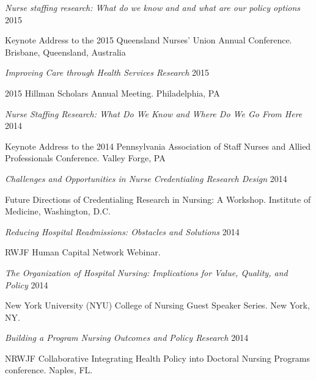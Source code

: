 \documentclass[10pt,]{article}
\begin{document}
{{{{{{{{{{{{{{{\begin{hangparas}{.5in}{1}
{\textit {Nurse staffing research: What do we know and and what are our policy options}} \hfill 2015 
\vspace{-2.5mm}
\begin{adjustwidth}{0.5cm}{1cm}
Keynote Address to the 2015 Queensland Nurses’ Union Annual Conference. Brisbane, Queensland, Australia
\end{adjustwidth}

{\textit {Improving Care through Health Services Research}} \hfill 2015 
\vspace{-2.5mm}
\begin{adjustwidth}{0.5cm}{1cm}
2015 Hillman Scholars Annual Meeting. Philadelphia, PA 
\end{adjustwidth}

{\textit {Nurse Staffing Research: What Do We Know and Where Do We Go From Here}} \hfill 2014 
\vspace{-2.5mm}
\begin{adjustwidth}{0.5cm}{1cm}
Keynote Address to the 2014 Pennsylvania Association of Staff Nurses and Allied Professionals Conference. Valley Forge, PA 
\end{adjustwidth}

{\textit {Challenges and Opportunities in Nurse Credentialing Research Design}} \hfill 2014 
\vspace{-2.5mm}
\begin{adjustwidth}{0.5cm}{1cm}
Future Directions of Credentialing Research in Nursing: A Workshop. Institute of Medicine, Washington, D.C. 
\end{adjustwidth}

{\textit {Reducing Hospital Readmissions: Obstacles and Solutions}} \hfill 2014 
\vspace{-2.5mm}
\begin{adjustwidth}{0.5cm}{1cm}
RWJF Human Capital Network Webinar.
\end{adjustwidth}

{\textit {The Organization of Hospital Nursing: Implications for Value, Quality, and Policy}} \hfill 2014 
\vspace{-2.5mm}
\begin{adjustwidth}{0.5cm}{1cm}
New York University (NYU) College of Nursing Guest Speaker Series. New York, NY.
\end{adjustwidth}

{\textit {Building a Program Nursing Outcomes and Policy Research}} \hfill 2014 
\vspace{-2.5mm}
\begin{adjustwidth}{0.5cm}{1cm}
NRWJF Collaborative Integrating Health Policy into Doctoral Nursing Programs conference. Naples, FL.
\end{adjustwidth}


\end{hangparas}}}}}}}}}}}}}}}}
\end{document}
